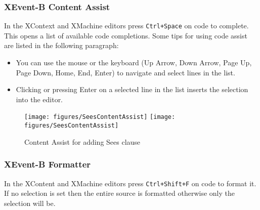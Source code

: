 \subsubsection{XEvent-B Content Assist}
\label{sec:xevent-b-content}
In the XContext and XMachine editors press \texttt{Ctrl+Space} on code to complete. This opens a list of available code completions. Some tips for using code assist are listed in the following paragraph:
\begin{itemize}
\item You can use the mouse or the keyboard (Up Arrow, Down Arrow, Page Up, Page Down, Home, End, Enter) to navigate and select lines in the list.

\item Clicking or pressing Enter on a selected line in the list inserts the selection into the editor.
\end{itemize}
\begin{figure}[!htbp]
  \centering
  \texttt{[image: figures/SeesContentAssist]}
  \else
  \texttt{[image: figures/SeesContentAssist]}
  \endif
  \caption{Content Assist for adding Sees clause}
  \label{fig:SeesContentAssist}
\end{figure}

\subsubsection{XEvent-B Formatter}
\label{sec:xevent-b-formatter}
In the XContent and XMachine editors press \texttt{Ctrl+Shift+F} on code to format it. If no selection is set then the entire source is formatted otherwise only the selection will be. 

